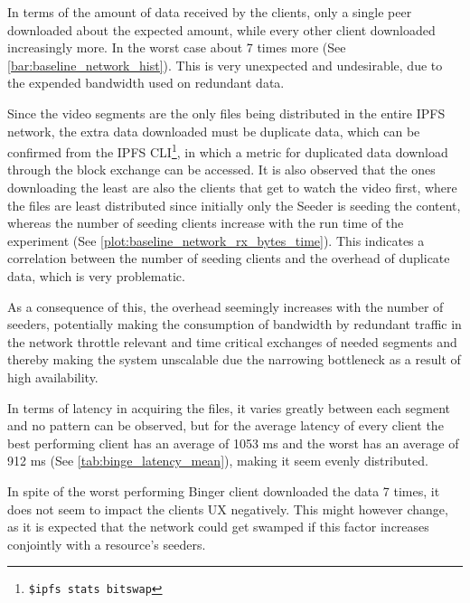 In terms of the amount of data received by the clients, only a single peer downloaded about the expected amount, while every other client downloaded increasingly more. In the worst case about 7 times more (See \autoref{bar:baseline_network_hist}). This is very unexpected and undesirable, due to the expended bandwidth used on redundant data.

\if{}

\fi

Since the video segments are the only files being distributed in the entire \ac{IPFS} network, the extra data downloaded must be duplicate data, which can be confirmed from the \ac{IPFS} \ac{CLI}\footnote{\texttt{\$ipfs stats bitswap}}, in which a metric for duplicated data download through the block exchange can be accessed. It is also observed that the ones downloading the least are also the clients that get to watch the video first, where the files are least distributed since initially only the Seeder is seeding the content, whereas the number of seeding clients increase with the run time of the experiment (See \autoref{plot:baseline_network_rx_bytes_time}). This indicates a correlation between the number of seeding clients and the overhead of duplicate data, which is very problematic.

As a consequence of this, the overhead seemingly increases with the number of seeders, potentially making the consumption of bandwidth by redundant traffic in the network throttle relevant and time critical exchanges of needed segments and thereby making the system unscalable due the narrowing bottleneck as a result of high availability.

\if{}

\fi

In terms of latency in acquiring the files, it varies greatly between each segment and no pattern can be observed, but for the average latency of every client the best performing client has an average of 1053 \ac{ms} and the worst has an average of 912 \ac{ms} (See \autoref{tab:binge_latency_mean}), making it seem evenly distributed.

\if{}

\fi

In spite of the worst performing Binger client downloaded the data 7 times, it does not seem to impact the clients \ac{UX} negatively. This might however change, as it is expected that the network could get swamped if this factor increases conjointly with a resource's seeders.

